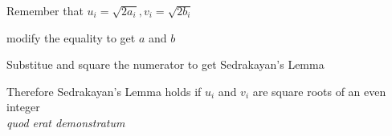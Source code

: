 \documentclass[12pt, a4paper]{article}
\begin{document}
\raggedright
\vspace{0.5cm}
Remember that $u_i = \sqrt{2a_i}, v_i = \sqrt{2b_i}$

modify the equality to get $a$ and $b$

\centering{\fontsize{17}{18}\selectfont

\[
  u_i = \sqrt{2a_i}
\]
\[
  a = (\frac{u_i^{2}}{2})
\]
\[
  \sqrt{v_i} = \sqrt{2b_i}
\]
\[
  b = (\frac{\sqrt{v_i}^{2}}{2})
\]
}

\raggedright
\vspace{0.5cm}
Substitue and square the numerator to get Sedrakayan's Lemma

\centering{\fontsize{17}{18}\selectfont

\[
  \frac{\sum_{i=1}^{n}\frac{u_i^{2}}{2}}{\sum_{i=1}^{n}\frac{\sqrt{v_i}^{2}}{2}} \leq \sum_{i=1}^{n}\frac{\frac{u_i^{2}}{2}}{\frac{\sqrt{v_i}^{2}}{2}}
  \]

\[
  \frac{(\sum_{i=1}^{n}u_i)^{2}}{\sum_{i=1}^{n}v_i} \leq \sum_{i=1}^{n}\frac{u_i^{2}}{v_i}
\]
}

\raggedright
\vspace{0.5cm}
Therefore Sedrakayan's Lemma holds if $u_i$ and $v_i$ are square roots of an even integer
\\
\centering
\vspace{0.5cm}
\textit{quod erat demonstratum}
\end{document}
